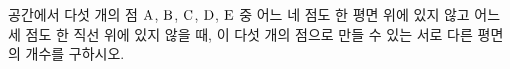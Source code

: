 공간에서 다섯 개의 점 $\mathrm{A}$, $\mathrm{B}$, $\mathrm{C}$, $\mathrm{D}$, $\mathrm{E}$ 중 어느 네 점도 한 평면 위에 있지 않고 어느 세 점도 한 직선 위에 있지 않을 때, 이 다섯 개의 점으로 만들 수 있는 서로 다른 평면의 개수를 구하시오.
